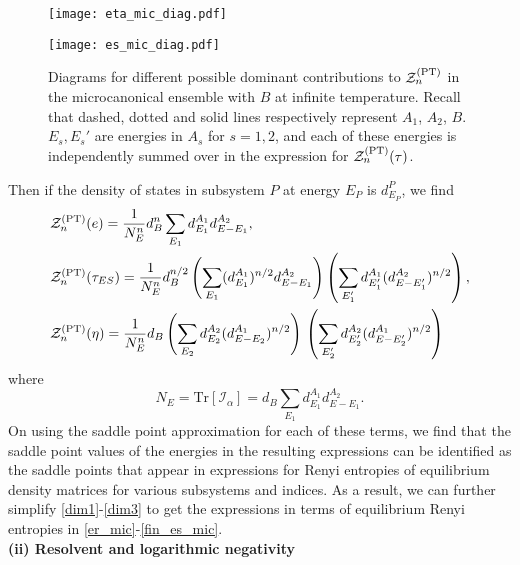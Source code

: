\documentclass[a4paper,11pt]{article}
\newcommand{\be}{\begin{equation}}
\newcommand{\ee}{\end{equation}}
\newcommand{\bea}{\begin{eqnarray}}
\newcommand{\eea}{\end{eqnarray}}
\newcommand\al{{\alpha}}
\newcommand\sI{{\ensuremath{{\mathcal I}}}}
\newcommand\sZ{{\mathcal Z}}
\begin{document}
\begin{enumerate}
\begin{appendix}
\begin{figure}[]
\vspace{0.2cm}

\texttt{[image: eta\_mic\_diag.pdf]} 

\vspace{0.2cm}

\texttt{[image: es\_mic\_diag.pdf]}
\caption{Diagrams for different possible dominant contributions to $\sZ_n^{\rm (PT)}$ in the microcanonical ensemble with $B$ at infinite temperature. Recall that dashed, dotted and solid lines respectively represent $A_1$, $A_2$, $B$. $E_s, E_s'$ are energies in $A_s$ for $s=1,2$, and each of these energies is independently summed over in the expression for $\sZ_n^{\rm (PT)}(\tau)$.}
\label{fig:mic_infb_taus}
\end{figure}

Then if the density of states in subsystem $P$ at energy $E_P$ is $d^P_{E_P}$, we find 
\bea
 &\sZ_n^{\rm (PT)}(e) = \frac{1}{N_E^n} d_B^n \sum_{E_1} d^{A_1}_{E_1} d^{A_2}_{E- E_1} , \label{dim1} \\ 
 &\sZ_n^{\rm (PT)}(\tau_{ES}) = \frac{1}{N_E^n} d_B^{n/2} \left( \sum_{E_1} (d^{A_1}_{E_1})^{n/2} d^{A_2}_{E- E_1} \right) \left( \sum_{{E_1'}} d^{A_1}_{E'_1} (d^{A_2}_{E- E'_1})^{n/2} \right) , \label{dim2} \\
&\sZ_n^{\rm (PT)}(\eta) = \frac{1}{N_E^n} d_B \left(\sum_{E_2} d^{A_2}_{E_2} (d^{A_1}_{E- E_2})^{n/2}\right) \, \left(\sum_{E'_2} d^{A_2}_{E'_2} (d^{A_1}_{E- E'_2})^{n/2}\right) \label{dim3}
\eea
where 
\be
N_E= \text{Tr}[\sI_{\al}] = d_B \sum_{E_1} d^{A_1}_{E_1} d^{A_2}_{E-E_1}.
\ee
 On using the saddle point approximation for each of these terms, we find that the saddle point values of the energies in the resulting expressions can be identified as the saddle points that appear in expressions for Renyi entropies of equilibrium density matrices for various subsystems and indices. As a result, we can further simplify \eqref{dim1}-\eqref{dim3} to get the expressions in terms of equilibrium Renyi entropies in \eqref{er_mic}-\eqref{fin_es_mic}. \\

\noindent \textbf{(ii) Resolvent and logarithmic negativity}\\ 


\end{appendix}
\end{enumerate}
\end{document}
